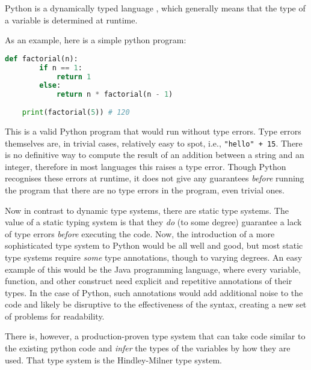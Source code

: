 \documentclass{l4proj}
\begin{document}

Python is a dynamically typed language \citep{Rossum_2017}, which generally means that the type of a variable is determined at runtime.

As an example, here is a simple python program:
\begin{lstlisting}[language=Python, label=lst:intro-example, caption=A simple python program to find the factorial of a given number (n).]
    def factorial(n):
        if n == 1:
            return 1
        else:
            return n * factorial(n - 1)
    
    print(factorial(5)) # 120
\end{lstlisting}

This is a valid Python program that would run without type errors.
Type errors themselves are, in trivial cases, relatively easy to spot, i.e., \texttt{"hello" + 15}.
There is no definitive way to compute the result of an addition between a string and an integer, therefore in most languages this raises a type error. 
Though Python recognises these errors at runtime, it does not give any guarantees \emph{before} running the program that there are no type errors in the program, even trivial ones.

Now in contrast to dynamic type systems, there are static type systems.
The value of a static typing system is that they \emph{do} (to some degree) guarantee a lack of type errors \emph{before} executing the code.
Now, the introduction of a more sophisticated type system to Python would be all well and good, but most static type systems require \emph{some} type annotations, though to varying degrees.
An easy example of this would be the Java programming language, where every variable, function, and other construct need explicit and repetitive annotations of their types.
In the case of Python, such annotations would add additional noise to the code and likely be disruptive to the effectiveness of the syntax, creating a new set of problems for readability.

There is, however, a production-proven type system that can take code similar to the existing python code and \emph{infer} the types of the variables by how they are used.
That type system is the Hindley-Milner type system. \citep{Hindley_1969} \citep{Milner_1978} \citep{Damas_Milner_1982}
\end{document}
